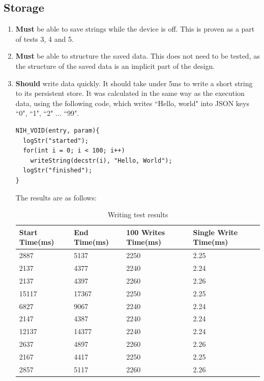 \documentclass{article}
\begin{document}
\subsection{Storage}
\begin{enumerate}
\item \textbf{Must} be able to save strings while the device is off. This is proven as a part of tests 3, 4 and 5.
\item \textbf{Must} be able to structure the saved data. This does not need to be tested, as the structure of the saved data is an implicit part of the design.
\item \textbf{Should} write data quickly. It should take under 5ms to write a short string to its persistent store. It was calculated in the same way as the execution data, using the following code, which writes ``Hello, world" into JSON keys ``0", ``1", ``2" ... ``99".

\begin{tcolorbox}[colback=white,grow to left by=2.5mm,grow to right by=2.5mm,left*=0mm,right*=0mm,sharp corners]
\begin{verbatim}
NIH_VOID(entry, param){
  logStr("started");
  for(int i = 0; i < 100; i++)
    writeString(decstr(i), "Hello, World");
  logStr("finished");
}
\end{verbatim}
\end{tcolorbox}

The results are as follows:
\begin{table}[H]
\begin{tabular}{|l|l|l|l|}
\hline
Start Time(ms)		&End Time(ms)				&100 Writes Time(ms)		&Single Write Time(ms)		\\ \hline
2887	 & 5137	 & 2250	 & 2.25\\ \hline
2137	 & 4377	 & 2240	 & 2.24\\ \hline
2137	 & 4397	 & 2260	 & 2.26\\ \hline
15117	 & 17367	 & 2250	 & 2.25\\ \hline
6827	 & 9067	 & 2240	 & 2.24\\ \hline
2147	 & 4387	 & 2240	 & 2.24\\ \hline
12137	 & 14377	 & 2240	 & 2.24\\ \hline
2637	 & 4897	 & 2260	 & 2.26\\ \hline
2167	 & 4417	 & 2250	 & 2.25\\ \hline
2857	 & 5117	 & 2260	 & 2.26\\ \hline
\end{tabular}
\caption{Writing test results}
\end{table}


\end{enumerate}
\end{document}
